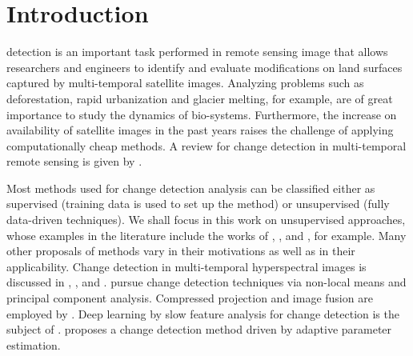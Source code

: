 \documentclass[journal]{IEEEtran}
\begin{document}
%
\IEEEpeerreviewmaketitle



\section{Introduction}
% 
% 
% 
% 

 detection is an important task performed in remote sensing image that allows researchers and engineers to identify and evaluate modifications on land surfaces captured by multi-temporal satellite images. Analyzing problems such as deforestation, rapid urbanization and glacier melting, for example, are of great importance to study the dynamics of bio-systems. Furthermore, the increase on availability of satellite images in the past years raises the challenge of applying computationally cheap methods. A review for change detection in multi-temporal remote sensing is given by \cite{ban2016change}.

Most methods used for change detection analysis can be classified either as supervised (training data is used to set up the method) or unsupervised (fully data-driven techniques). We shall focus in this work on unsupervised approaches, whose examples in the literature include the works of \cite{bruzzone2000automatic}, \cite{celik2010change}, \cite{quin2014mimosa} and \cite{saha2020change}, for example. Many other proposals of methods vary in their motivations as well as in their applicability.  Change detection in multi-temporal hyperspectral images is discussed in \cite{bovolo2015time},  \cite{liu2019review}, and \cite{matsunaga2017current}.  \cite{jia2018novel} pursue change detection techniques via non-local means and principal component analysis. Compressed projection and image fusion are employed by \cite{hou2014unsupervised}. Deep learning by slow feature analysis for change detection is the subject of \cite{du2019unsupervised}. \cite{chen2020change} proposes a change detection method driven by adaptive parameter estimation.
\end{document}

